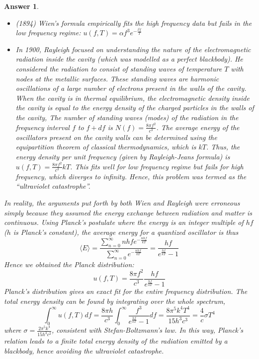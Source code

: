 \documentclass[a4paper]{article}
\newtheorem{ans}{Answer}[subsection]
\theoremstyle{new}
\begin{document}
\begin{ans}
\begin{itemize}
\item (1894) Wien's formula empirically fits the high frequency data but fails in the low frequency regime: $u(f,T)=\alpha f^3e^{-\frac{\beta f}{T}}$
\item In 1900, Rayleigh focused on understanding the nature of the electromagnetic radiation inside the cavity (which was modelled as a perfect blackbody). He considered the radiation to consist of standing waves of temperature $T$ with nodes at the metallic surfaces. These standing waves are harmonic oscillations of a large number of electrons present in the walls of the cavity.\\[5pt]
When the cavity is in thermal equilibrium, the electromagnetic density inside the cavity is equal to the energy density of the charged particles in the walls of the cavity, The number of standing waves (modes) of the radiation in the frequency interval $f$ to $f+df$ is $N(f)=\frac{8\pi f^2}{c^3}$. The average energy of the oscillators present on the cavity walls can be determined using the equipartition theorem of classical thermodynamics, which is $kT$. Thus, the energy density per unit frequency (given by Rayleigh-Jeans formula) is $u(f,T)=\frac{8\pi f^2}{c^3}kT$. 
This fits well for low frequency regime but fails for high frequency, which diverges to infinity. Hence, this problem was termed as the ``ultraviolet catastrophe''.
\end{itemize}
In reality, the arguments put forth by both Wien and Rayleigh were erroneous simply because they assumed the energy exchange between radiation and matter is continuous. Using Planck's postulate where the energy is an integer multiple of $hf$ ($h$ is Planck's constant), the average energy for a quantized oscillator is thus
$$\big \langle E \big \rangle = \frac{\sum_{n=0}^{\infty} nhfe^{-\frac{nhf}{kT}}}{\sum_{n=0}^{\infty}e^{-\frac{nhf}{kT}}}=\frac{hf}{e^{\frac{hf}{kT}}-1}$$
Hence we obtained the Planck distribution:
$$u(f,T)=\frac{8\pi f^2}{c^3}\frac{hf}{e^{\frac{hf}{kT}}-1}$$
Planck's distribution gives an exact fit for the entire frequency distribution. The total energy density can be found by integrating over the whole spectrum,
$$
\int_{0}^{\infty}u(f,T)df=\frac{8\pi h}{c^3}\int_{0}^{\infty}\frac{f^3}{e^{\frac{hf}{kT}}-1}df=\frac{8\pi^5 k^4T^4}{15h^3c^3}=\frac{4}{c}\sigma T^4$$
where $\sigma = \frac{2\pi^5 k^4}{15h^3c^2}$, consistent with Stefan-Boltzmann's law. In this way, Planck's relation leads to a finite total energy density of the radiation emitted by a blackbody, hence avoiding the ultraviolet catastrophe.

\end{ans}
\end{document}
